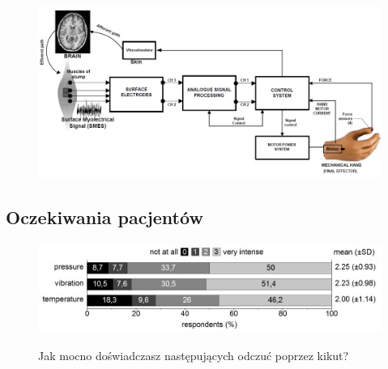 \documentclass[8pt]{beamer}
\begin{document}
\begin{frame}%
	\begin{center}
		\begin{figure}
			\includegraphics[width=\textwidth]{graphics/feedback.jpg}
			\label{graph:feedback}	
		\end{figure}
	\end{center}
\end{frame}

	\subsection{Oczekiwania pacjentów}
		\begin{frame}
			\begin{center}
				\begin{figure}
					\includegraphics[width=\textwidth]{graphics/sensitivity.jpg}
					\label{graph:feedback2}	
					\caption{Jak mocno doświadczasz następujących odczuć poprzez kikut? \cite{6226669}}
				\end{figure}
			\end{center}
		\end{frame}			
	
						
		
\end{document}

